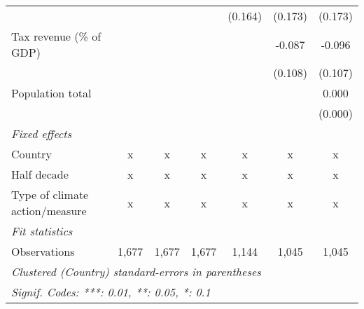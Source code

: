 \begin{tabular}{lcccccc}
                                              &               &               &                & (0.164)        & (0.173)        & (0.173)\\   
   Tax revenue (\% of GDP)                    &               &               &                &                & -0.087         & -0.096\\   
                                              &               &               &                &                & (0.108)        & (0.107)\\   
   Population total                           &               &               &                &                &                & 0.000\\   
                                              &               &               &                &                &                & (0.000)\\   
   \emph{Fixed effects}\\
   Country                                    & x             & x             & x              & x              & x              & x\\  
   Half decade                                & x             & x             & x              & x              & x              & x\\  
   Type of climate action/measure             & x             & x             & x              & x              & x              & x\\  
   \midrule \emph{Fit statistics}\\
   Observations                               & 1,677         & 1,677         & 1,677          & 1,144          & 1,045          & 1,045\\  
   \midrule
   \multicolumn{7}{l}{\emph{Clustered (Country) standard-errors in parentheses}}\\
   \multicolumn{7}{l}{\emph{Signif. Codes: ***: 0.01, **: 0.05, *: 0.1}}\\
\end{tabular}
\par\endgroup


